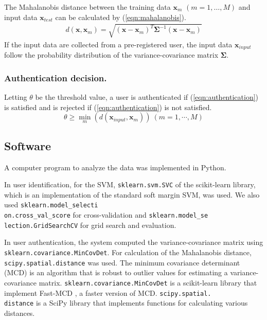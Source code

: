 \documentclass[sigconf,authordraft]{acmart}
\begin{document}
The Mahalanobis distance between the training data $\bm{x}_m$ $(m=1,\dots, M)$ and input data $\bm{x}_{test}$ can be calculated by (\ref{eqn:mahalanobis}).
\begin{eqnarray}
\label{eqn:mahalanobis}
  d(\bm{x},\bm{x}_m) = \sqrt{(\bm{x}-\bm{x}_m)^{T}\bm{\Sigma}^{-1}(\bm{x}-\bm{x}_m)}
\end{eqnarray}
If the input data are collected from a pre-registered user, the input data $\bm{x}_{input}$ follow the probability distribution of the variance-covariance matrix $\bm{\Sigma}$.


\subsubsection{Authentication decision.}
Letting $\theta$ be the threshold value, a user is authenticated if (\ref{eqn:authentication}) is satisfied and is rejected if (\ref{eqn:authentication}) is not satisfied.
\begin{equation}
\label{eqn:authentication}
  \theta \geq \min_m(d(\bm{x}_{input},\bm{x}_m))~(m=1,\cdots,M)
\end{equation}


\subsection{Software}
A computer program to analyze the data was implemented in Python.\par

In user identification, for the SVM, \texttt{sklearn.svm.SVC} of the scikit-learn \cite{scikit-learn} library, which is an implementation of the standard soft margin SVM, was used. We also used \texttt{sklearn.model\_selecti}\\\texttt{on.cross\_val\_score} for cross-validation and \texttt{sklearn.model\_se}\\\texttt{lection.GridSearchCV} for grid search and evaluation.\par

In user authentication, the system computed the variance-covariance matrix using \texttt{sklearn.covariance.MinCovDet}. For calculation of the Mahalanobis distance, \texttt{scipy.spatial.distance} was used. The minimum covariance determinant (MCD) is an algorithm that is robust to outlier values for estimating a variance-covariance matrix. \texttt{sklearn.covariance.MinCovDet} is a scikit-learn library that implement Fast-MCD \cite{fast_mcd}, a faster version of MCD. \texttt{scipy.spatial.}\\\texttt{distance} is a SciPy \cite{scipy} library that implements functions for calculating various distances.
\end{document}
